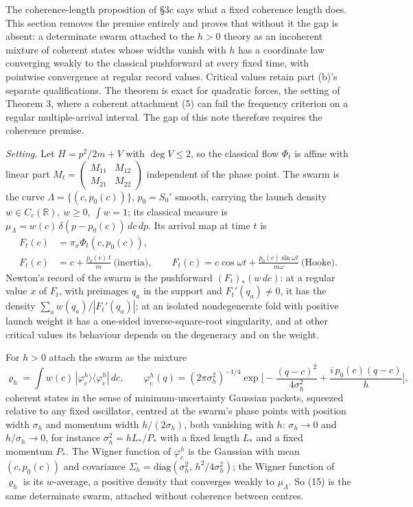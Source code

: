 \documentclass[11pt,a4paper]{article}
\begin{document}
The coherence-length proposition of §3c says what a fixed coherence
length does. This section removes the premise entirely and proves that
without it the gap is absent: a determinate swarm attached to the
\(h>0\) theory as an incoherent mixture of coherent states whose widths
vanish with \(h\) has a coordinate law converging weakly to the
classical pushforward at every fixed time, with pointwise convergence at
regular record values. Critical values retain part (b)'s separate
qualifications. The theorem is exact for quadratic forces, the setting
of Theorem 3, where a coherent attachment (5) can fail the frequency
criterion on a regular multiple-arrival interval. The gap of this note
therefore requires the coherence premise.

\emph{Setting.} Let \(H=p^2/2m+V\) with \(\deg V\le2\), so the classical
flow \(\Phi_t\) is affine with linear part
\(M_t=\begin{pmatrix}M_{11}&M_{12}\\M_{21}&M_{22}\end{pmatrix}\)
independent of the phase point. The swarm is the curve
\(\Lambda=\{(c,p_0(c))\}\), \(p_0=S_0'\) smooth, carrying the launch
density \(w\in C_c(\mathbb R)\), \(w\ge0\), \(\int w=1\); its classical
measure is \(\mu_\Lambda=w(c)\,\delta(p-p_0(c))\,dc\,dp\). Its arrival
map at time \(t\) is \[\begin{aligned}
F_t(c)&=\pi_x\Phi_t(c,p_0(c)),\\
F_t(c)&=c+\frac{p_0(c)\,t}{m}\ \text{(inertia)},\qquad
F_t(c)=c\cos\omega t+\frac{p_0(c)\sin\omega t}{m\omega}\ \text{(Hooke)}.
\end{aligned}\tag{14}\] Newton's record of the swarm is the pushforward
\((F_t)_*(w\,dc)\): at a regular value \(x\) of \(F_t\), with preimages
\(q_a\) in the support and \(F_t'(q_a)\neq0\), it has the density
\(\sum_aw(q_a)/|F_t'(q_a)|\); at an isolated nondegenerate fold with
positive launch weight it has a one-sided inverse-square-root
singularity, and at other critical values its behaviour depends on the
degeneracy and on the weight.

For \(h>0\) attach the swarm as the mixture
\[\varrho_h=\int w(c)\,|\varphi^h_c\rangle\langle\varphi^h_c|\,dc,\qquad
\varphi^h_c(q)=(2\pi\sigma_h^2)^{-1/4}
\exp\Big[-\frac{(q-c)^2}{4\sigma_h^2}+\frac{i\,p_0(c)(q-c)}{h}\Big],\tag{15}\]
coherent states in the sense of minimum-uncertainty Gaussian packets,
squeezed relative to any fixed oscillator, centred at the swarm's phase
points with position width \(\sigma_h\) and momentum width
\(h/(2\sigma_h)\), both vanishing with \(h\): \(\sigma_h\to0\) and
\(h/\sigma_h\to0\), for instance \(\sigma_h^2=hL_*/P_*\) with a fixed
length \(L_*\) and a fixed momentum \(P_*\). The Wigner function of
\(\varphi^h_c\) is the Gaussian with mean \((c,p_0(c))\) and covariance
\(\Sigma_h=\mathrm{diag}(\sigma_h^2,\,h^2/4\sigma_h^2)\); the Wigner
function of \(\varrho_h\) is its \(w\)-average, a positive density that
converges weakly to \(\mu_\Lambda\). So (15) is the same determinate
swarm, attached without coherence between centres.
\end{document}
